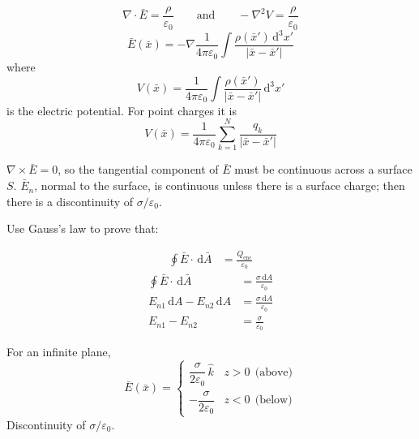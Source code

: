 \documentclass[11pt]{article}
\newcommand{\kh}{\hat{k}}
\newcommand{\eps}{\varepsilon_0}
\newcommand{\dd}{\,\mathrm{d}}
\begin{document}
\[
  \nabla\cdot\bar{E} = \frac{\rho}{\eps}
  \qquad\text{and}\qquad
  -\nabla^2V = \frac{\rho}{\eps}
\]
\[
  \bar{E}(\bar{x}) = -\nabla\frac{1}{4\pi\eps}\int\frac{\rho(\bar{x}')\dd^3x'}{|\bar{x}-\bar{x}'|}
\]
where
\[
  V(\bar{x}) = \frac{1}{4\pi\eps}\int\frac{\rho(\bar{x}')}{|\bar{x}-\bar{x}'|}\dd^3x'
\]
is the electric potential. For point charges it is
\[
  V(\bar{x}) = \frac{1}{4\pi\eps}\sum_{k=1}^{N}\frac{q_k}{|\bar{x}-\bar{x}'|}
\]

$\nabla\times\bar{E}=0$, so the tangential component of $\bar{E}$ must be continuous across a surface $S$. $\bar{E}_n$, normal to the surface, is continuous unless there is a surface charge; then there is a discontinuity of $\sigma/\eps$.

Use Gauss's law to prove that:

\begin{center}
\end{center}

\begin{align*}
  \oint\bar{E}\cdot\dd\bar{A} &= \frac{Q_{\mathrm{enc}}}{\eps}
\end{align*}
\begin{align*}
  \oint\bar{E}\cdot\dd\bar{A} &= \frac{\sigma\dd A}{\eps}\\[1ex]
  E_{n1}\dd A - E_{n2}\dd A &= \frac{\sigma\dd A}{\eps}\\[1ex]
  E_{n1} - E_{n2} &= \frac{\sigma}{\eps}
\end{align*}

For an infinite plane,
\[
  \bar{E}(\bar{x}) =
  \begin{cases}
    \dfrac{\sigma}{2\eps}\,\kh & z>0\ \ \text{(above)}\\[2ex]
    -\dfrac{\sigma}{2\eps} & z<0\ \ \text{(below)}
  \end{cases}
\]
Discontinuity of $\sigma/\eps$.
\end{document}
